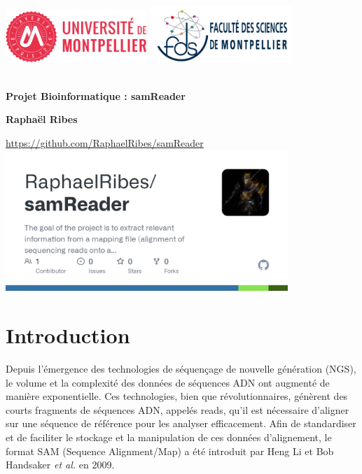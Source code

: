 \documentclass[11pt]{article}
\begin{document}
\begin{titlepage}
    \begin{center}
        \includegraphics[width=0.4\textwidth]{UM} \hfill{} %
        \includegraphics[width=0.4\textwidth]{FDS} %

        \vspace{3cm}

        \hrulefill\\[0.4cm]
        {\Huge \textbf{Projet Bioinformatique : samReader}}\\[0.4cm]
        \hrulefill

        \vspace{1.5cm}

        \large{\textbf{Raphaël Ribes}}\\[0.5cm]

        \vfill

        \url{https://github.com/RaphaelRibes/samReader}
        \href{https://github.com/RaphaelRibes/samReader}{%
            \includegraphics[width=0.8\textwidth]{samReader} %
        }
    \end{center}
\end{titlepage}

\section{Introduction}\label{sec:introduction}
Depuis l'émergence des technologies de séquençage de nouvelle génération (NGS), le volume et la complexité des données de séquences ADN ont augmenté de manière exponentielle.
Ces technologies, bien que révolutionnaires, génèrent des courts fragments de séquences ADN, appelés reads, qu'il est nécessaire d'aligner sur une séquence de référence pour les analyser efficacement.
Afin de standardiser et de faciliter le stockage et la manipulation de ces données d'alignement, le format SAM (Sequence Alignment/Map) a été introduit par Heng Li et Bob Handsaker \textit{et al.} en 2009\cite{li_sequence_2009}.
\end{document}

